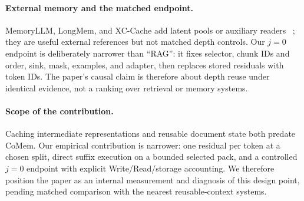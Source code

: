 \paragraph{External memory and the matched endpoint.}
MemoryLLM, LongMem, and XC-Cache add latent pools or auxiliary readers
~\citep{memoryllm,longmem,xccache}; they are useful external references but not
matched depth controls. Our $j{=}0$ endpoint is deliberately narrower than
``RAG'': it fixes selector, chunk IDs and order, sink, mask, examples, and
adapter, then replaces stored residuals with token IDs. The paper's causal claim
is therefore about depth reuse under identical evidence, not a ranking over
retrieval or memory systems.

\paragraph{Scope of the contribution.}
Caching intermediate representations and reusable document state both predate
CoMem. Our empirical contribution is narrower: one residual per token at a
chosen split, direct suffix execution on a bounded selected pack, and a
controlled $j{=}0$ endpoint with explicit Write/Read/storage accounting. We
therefore position the paper as an internal measurement and diagnosis of this
design point, pending matched comparison with the nearest reusable-context
systems.
